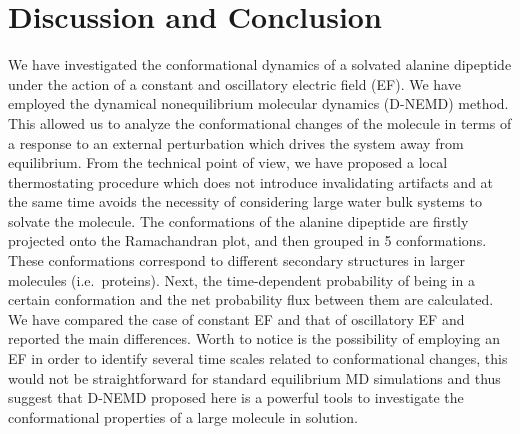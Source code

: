\documentclass[a4paper,preprint,unsortedaddress,onecolumn]{revtex4-1}
\begin{document}
\section{Discussion and Conclusion}
We have investigated the conformational
dynamics of a solvated alanine dipeptide under the action of a constant and oscillatory electric
field (EF).
We have employed the dynamical nonequilibrium molecular dynamics
(D-NEMD) method. This allowed us to analyze the conformational changes
of the molecule in terms of a response to an external perturbation
which drives the system away from equilibrium. From the technical
point of view, we have proposed a local thermostating procedure which
does not introduce invalidating artifacts and at the same time avoids
the necessity of considering large water bulk systems to solvate the
molecule.
The conformations of the alanine dipeptide are
firstly projected onto the Ramachandran plot, and
then grouped in 5  conformations.
These conformations
correspond to different secondary structures in larger molecules
(i.e.~proteins).
Next, the time-dependent probability
of being in a certain conformation and the net probability flux
between them are calculated.
We have compared the case of constant EF and that of oscillatory EF
and reported the main differences.
Worth to notice is the possibility of employing an EF in order to identify several time scales related to conformational changes, this would not be straightforward for standard equilibrium MD simulations and thus suggest that D-NEMD proposed here is a powerful tools to investigate the conformational properties of a large molecule in solution.
\end{document}
